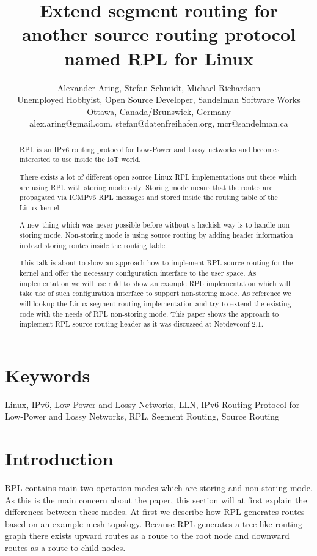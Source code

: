\documentclass[letterpaper]{article}
\title{Extend segment routing for another source routing protocol named RPL for Linux}
\author{Alexander Aring, Stefan Schmidt, Michael Richardson\\
Unemployed Hobbyist, Open Source Developer, Sandelman Software Works\\
Ottawa, Canada/Brunswick, Germany\\
alex.aring@gmail.com, stefan@datenfreihafen.org, mcr@sandelman.ca\\
\newline
\newline
}
\begin{document}
\maketitle
\begin{abstract}
RPL \cite{RFC6550} is an IPv6 routing protocol for Low-Power and Lossy networks and becomes interested to use inside the IoT world.

There exists a lot of different open source Linux RPL implementations out there which are using RPL with storing mode only.
Storing mode means that the routes are propagated via ICMPv6 RPL messages and stored inside the routing table of the Linux kernel.

A new thing which was never possible before without a hackish way is to handle non-storing mode.
Non-storing mode is using source routing by adding header information \cite{RFC6554} instead storing routes inside the routing table.

This talk is about to show an approach how to implement RPL source routing for the kernel and offer the necessary configuration interface to the user space.
As implementation we will use rpld \cite{rpld} to show an example RPL implementation which will take use of such configuration interface to support non-storing mode.
As reference we will lookup the Linux segment routing implementation and try to extend the existing code with the needs of RPL non-storing mode.
This paper shows the approach to implement RPL source routing header as it was discussed at Netdevconf 2.1.
\end{abstract}

\section{Keywords}

Linux, IPv6, Low-Power and Lossy Networks, LLN, IPv6 Routing Protocol for Low-Power and Lossy Networks, RPL, Segment Routing, Source Routing

\section{Introduction}

RPL contains main two operation modes which are storing and non-storing mode.
As this is the main concern about the paper, this section will at first explain the differences between these modes.
At first we describe how RPL generates routes based on an example mesh topology.
Because RPL generates a tree like routing graph there exists upward routes as a route to the root node and downward routes as a route to child nodes.
\end{document}

